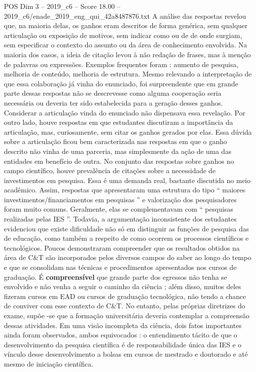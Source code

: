 \begin{textsample}{POS Dim 3 – 2019\_c6 – Score 18.00 – 2019\_c6/enade\_2019\_eng\_qui\_42a8487876.txt}
A análise das respostas revelou que, na maioria delas, os ganhos eram descritos de forma genérica, sem qualquer articulação ou exposição de motivos, sem indicar como ou de de onde surgiam, sem especificar o contexto do assunto ou da área de conhecimento envolvida.
Na maioria dos casos, a ideia de citação levou à não redação de frases, mas à menção de palavras ou expressões.
Exemplos frequentes foram : aumento de pesquisa, melhoria de conteúdo, melhoria de estrutura.
Mesmo relevando a interpretação de que essa colaboração já vinha do enunciado, foi surpreendente que em grande parte dessas respostas não se descrevesse como alguma cooperação seria necessária ou deveria ter sido estabelecida para a geração desses ganhos.
Considerar a articulação vinda do enunciado não dispensava essa revelação.
Por outro lado, houve respostas em que estudantes discutiram a importância da articulação, mas, curiosamente, sem citar os ganhos gerados por elas.
Essa dúvida sobre a articulação ficou bem caracterizada nas respostas em que o ganho descrito não vinha de uma parceria, mas simplesmente da ação de uma das entidades em benefício de outra.
No conjunto das respostas sobre ganhos no campo científico, houve prevalência de citações sobre a necessidade de investimentos em pesquisa.
Essa é uma demanda real, bastante discutida no meio acadêmico.
Assim, respostas que apresentaram uma estrutura do tipo “ maiores investimentos/financiamentos em pesquisas ” e valorização dos pesquisadores foram muito comuns.
Geralmente, elas se complementavam com “ pesquisas realizadas pelas IES ”.
Todavia, a argumentação inconsistente dos estudantes evidenciou que existe dificuldade não só em distinguir as funções de pesquisa das de educação, como também a respeito de como ocorrem os processos científicos e tecnológicos.
Poucos demonstraram compreender que os resultados obtidos na área de C\&T são incorporados pelos diversos campos do saber ao longo do tempo e que se consolidam nas técnicas e procedimentos apresentados nos cursos de graduação.
É \textbf{compreensível} que grande parte dos egressos não tenha se envolvido e não venha a seguir o caminho da ciência ; além disso, muitos deles fizeram cursos em EAD ou cursos de graduação tecnológica, não tendo a chance de conviver com esse contexto de C\&T.
No entanto, pelas próprias diretrizes do exame, supõe -se que a formação universitária deveria contemplar a compreensão dessas atividades.
Em uma visão incompleta da ciência, dois fatos importantes ainda foram observados, ambos equivocados : o entendimento tácito de que o desenvolvimento da pesquisa científica é de responsabilidade única das IES e o vínculo desse desenvolvimento a bolsas em cursos de mestrado e doutorado e até mesmo de iniciação científica.

\end{textsample}
